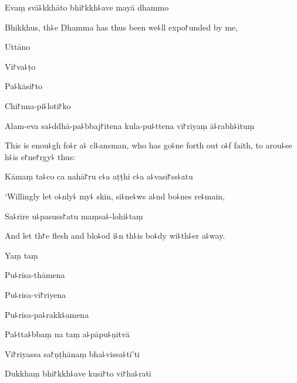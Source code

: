 Evaṃ svā꜕kkhāto bhi꜓kkh꜕ave mayā dhammo

\begin{english}
  Bhikkhus, th꜕e Dhamma has thus been we꜕ll expo꜓unded by me,
\end{english}

Uttāno


Vi꜓va꜕ṭo


Pa꜕kāsi꜓to


Chi꜓nna-pi꜕loti꜓ko


Alam-eva sa꜕ddhā-pa꜕bbaj꜓itena kula-pu꜕ttena vī꜓riyaṃ ā꜕rabh꜕ituṃ

\begin{english}
  This is enou꜕gh fo꜕r a꜕ cl꜕ansman, who has go꜕ne forth out o꜕f faith,
  to arou꜕se h꜕is e꜓ne꜓rgy꜕ thus:
\end{english}

Kāmaṃ ta꜕co ca nahā꜓ru c꜕a aṭṭhi c꜕a a꜕vasi꜓ss꜕atu

\begin{english}
  `Willingly let o꜕nly꜕ my꜕ skin, si꜕ne꜕ws a꜕nd bo꜕nes re꜕main,
\end{english}

Sa꜕rīre u꜕pasuss꜓atu maṃsa꜕-lohi꜕taṃ

\begin{english}
  And let th꜓e flesh and blo꜕od i꜕n th꜕is bo꜕dy wi꜕th꜕er a꜕way.
\end{english}

Yaṃ taṃ


Pu꜕risa-thāmena


Pu꜕risa-vī꜓riyena


Pu꜕risa-pa꜕rakk꜕amena


Pa꜕tta꜕bbaṃ na taṃ a꜕pāpu꜕ṇitvā


Vī꜓riyassa sa꜓ṇṭhānaṃ bha꜕vissa꜕tī'ti


Dukkhaṃ bhi꜓kkh꜕ave kusī꜓to vi꜓ha꜕rati

